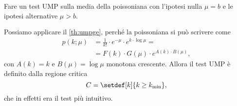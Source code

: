 \begin{exercise}
	Fare un test UMP sulla media della poissoniana con l'ipotesi nulla $\mu=b$ e le ipotesi alternative $\mu>b$.
\end{exercise}

\begin{solution}
	Possiamo applicare il \autoref{th:umpge},
	perché la poissoniana si può scrivere come
	\begin{align*}
		p(k;\mu)
		&= \frac1{k!} \cdot e^{-\mu} \cdot e^{k \cdot \log\mu} = \\
		&= F(k) \cdot G(\mu) \cdot e^{A(k) \cdot B(\mu)},
	\end{align*}
	con $A(k)=k$ e $B(\mu)=\log\mu$ monotona crescente.
	Allora il test UMP è definito dalla regione critica
	\begin{equation*}
		C = \setdef[k]{k \ge k_\mathrm{min}},
	\end{equation*}
	che in effetti era il test più intuitivo.
\end{solution}
